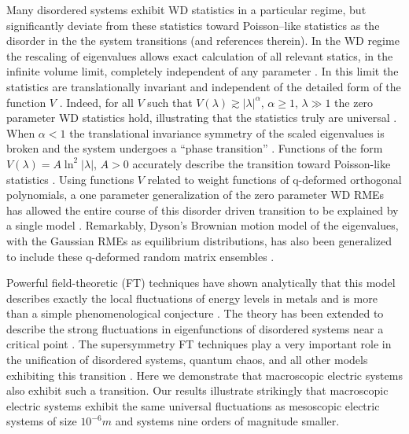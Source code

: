 \documentclass[english,12pt]{ttuthes}
\begin{document}
Many disordered systems exhibit WD statistics in a particular regime, 
but significantly deviate from these statistics toward Poisson--like
statistics as the disorder in the the system transitions 
\cite{Luo_etal:PLA:06,Muttalib_etal_qRME,Bandyopadhyay:PRE_SNSMP:07,Canali}
(and references therein). In the WD regime the rescaling of eigenvalues  
allows exact calculation of all relevant statics, in the infinite
volume limit, completely independent of any parameter
\cite{Mehta:2004:RMT}. In this limit the statistics are 
translationally invariant and independent of the detailed form of the
function $V$ \cite{Canali}. Indeed, for all $V$ such that
$V(\lambda)\gtrsim|\lambda|^\alpha$, $\alpha\geq1$, $\lambda\gg1$ the zero parameter WD statistics hold,
illustrating that the statistics truly are universal
\cite{Mehta:2004:RMT,Canali}. When $\alpha<1$ the translational invariance
symmetry of the scaled eigenvalues is broken and the system undergoes a
``phase transition'' \cite{Canali}. Functions of the form
$V(\lambda)=A\ln^2|\lambda|$, $A>0$ accurately describe the transition toward  
Poisson-like statistics \cite{Muttalib_etal_qRME,Canali}. Using
functions $V$ related to weight functions of q-deformed orthogonal   
polynomials, a one parameter generalization of the zero parameter WD
RMEs has allowed the entire course of this disorder driven transition
to be explained by a single model
\cite{Muttalib_etal_qRME}. Remarkably, Dyson's Brownian motion model
of the eigenvalues, with the Gaussian RMEs as equilibrium
distributions, has also been generalized to include these q-deformed
random matrix ensembles \cite{Blecken:JPA:31}.  

Powerful field-theoretic (FT) techniques have shown analytically that
this model describes exactly the local fluctuations of energy levels
in metals and is more than a simple phenomenological conjecture 
\cite{Efetov}. The theory has been extended to describe the strong 
fluctuations in eigenfunctions of disordered systems near a critical
point \cite{Kravtsov:PRL:1913,Mirlin:PhysRep:259}. The supersymmetry FT
techniques play a very important role in the unification of disordered
systems, quantum chaos, and all other models exhibiting this
transition \cite{Efetov}. Here we demonstrate that macroscopic
electric systems also exhibit such a transition. Our results illustrate
strikingly that macroscopic electric systems exhibit the same
universal fluctuations as mesoscopic electric systems of size
$10^{-6}m$ and systems nine orders of magnitude smaller.   
%
%

%
%
\end{document}
